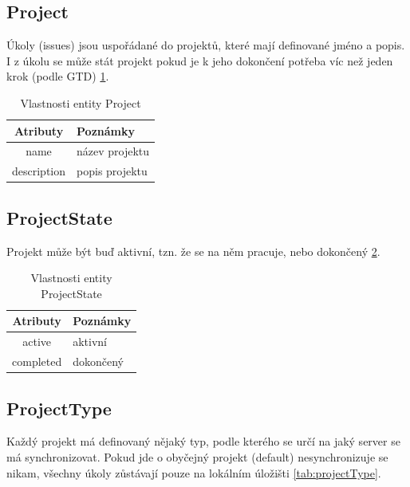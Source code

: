 \subsection{Project}
Úkoly (issues) jsou uspořádané do projektů, které mají definované jméno a popis. I z úkolu se může stát projekt pokud je k jeho dokončení potřeba víc než jeden krok (podle GTD) \ref{tab:project}.

\begin{table}[h]
\begin{center}
	\begin{tabular}{|c|l|}
	\hline
	Atributy & Poznámky \\
	\hline
	name & název projektu \\
	description & popis projektu \\
	\hline
	\end{tabular}
\end{center}
\caption{Vlastnosti entity Project}
\label{tab:project}
\end{table}

\subsection{ProjectState}
Projekt může být buď aktivní, tzn. že se na něm pracuje, nebo dokončený \ref{tab:projectState}.

\begin{table}[h]
\begin{center}
	\begin{tabular}{|c|l|}
	\hline
	Atributy & Poznámky \\
	\hline
	active & aktivní \\
	completed & dokončený \\
	\hline
	\end{tabular}
\end{center}
\caption{Vlastnosti entity ProjectState}
\label{tab:projectState}
\end{table}

\subsection{ProjectType}

Každý projekt má definovaný nějaký typ, podle kterého se určí na jaký server se má synchronizovat. Pokud jde o obyčejný projekt (default) nesynchronizuje se nikam, všechny úkoly zůstávají pouze na lokálním úložišti \ref{tab:projectType}.

